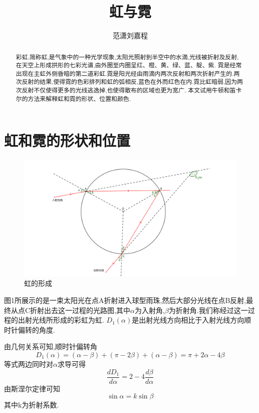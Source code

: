 \documentclass[a4paper]{article}%
\title{虹与霓}%
\author{范潇\phantom{1}刘嘉程}
\date{}%
\begin{document}
  \maketitle  
\begin{abstract}
   彩虹,简称虹,是气象中的一种光学现象,太阳光照射到半空中的水滴,光线被折射及反射,在天空上形成拱形的七彩光谱,由外圈至内圈呈红、橙、黄、绿、蓝、靛、紫.
   霓是经常出现在主虹外侧昏暗的第二道彩虹.霓是阳光经由雨滴内两次反射和两次折射产生的.两次反射的结果,使得霓的色彩排列和虹的弧相反,蓝色在外而红色在内.霓比虹暗弱,因为两次反射不仅使得更多的光线逃逸掉,也使得散布的区域也更为宽广.
   本文试用牛顿和笛卡尔的方法来解释虹和霓的形状、位置和颜色.
\end{abstract}

\section{虹和霓的形状和位置}
\begin{figure}[ht]
   \centering
   \includegraphics[scale=0.8]{图1}
   \caption[图1]{虹的形成}\label{fig-图1}
   \end{figure}
图1所展示的是一束太阳光在点A折射进入球型雨珠,然后大部分光线在点B反射,最终从点C折射出去这一过程的光路图,其中$\alpha$为入射角,$\beta$为折射角.我们称经过这一过程的出射光线所形成的彩虹为虹.
$D_1(\alpha)$是出射光线方向相比于入射光线方向顺时针偏转的角度.


由几何关系可知,顺时针偏转角
\begin{equation*}
D_1(\alpha)=(\alpha-\beta)+(\pi-2\beta)+(\alpha-\beta)=\pi+2\alpha-4\beta\tag{式1}
\end{equation*}
等式两边同时对$\alpha$求导可得
\begin{equation*}
\frac{dD_1}{d\alpha}=2-4\frac{d\beta}{d\alpha}\tag{式2}
\end{equation*}
由斯涅尔定律可知
\begin{equation*}
\sin\alpha=k\sin\beta\tag{式3}
\end{equation*}
其中k为折射系数.
\end{document}
